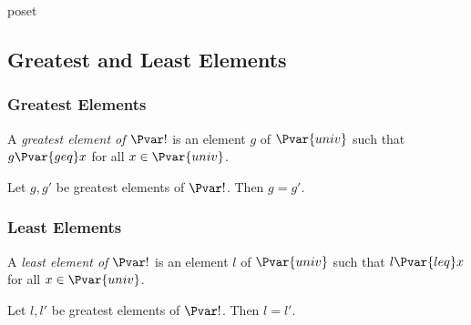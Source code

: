 \documentclass{stex}
\begin{document}
\begin{smodule}{poset}
  \subsection{Greatest and Least Elements}

  \subsubsection{Greatest Elements}

  \begin{forthel}
    \begin{definition*}
      A \emph{greatest element of $\Pvar!$} is an element $g$ of $\Pvar{univ}$ such that $g {\Pvar{geq}} x$ for all $x \in \Pvar{univ}$.
    \end{definition*}

    \begin{proposition*}
      Let $g, g'$ be greatest elements of $\Pvar!$.
      Then $g = g'$.
    \end{proposition*}
  \end{forthel}

  \subsubsection{Least Elements}

  \begin{forthel}
    \begin{definition*}
      A \emph{least element of $\Pvar!$} is an element $l$ of $\Pvar{univ}$ such that $l {\Pvar{leq}} x$ for all $x \in \Pvar{univ}$.
    \end{definition*}

    \begin{proposition*}
      Let $l, l'$ be greatest elements of $\Pvar!$.
      Then $l = l'$.
    \end{proposition*}
  \end{forthel}
\end{smodule}
\end{document}
